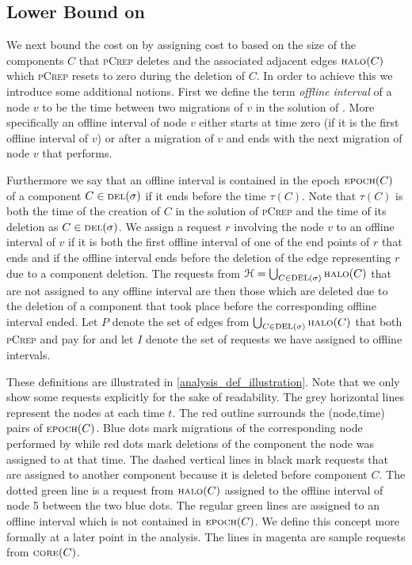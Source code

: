 \documentclass[a4paper,UKenglish,cleveref, autoref, thm-restate,authorcolumns]{lipics-v2019}
\newcommand{\adjDel}{\textsc{pCrep}}
\newcommand{\del}{\text{\scriptsize DEL}}
\newcommand{\opt}{\text{O{\scriptsize PT}}}
\newcommand{\core}{\text{\scriptsize CORE}}
\newcommand{\halo}{\text{\scriptsize HALO}}
\newcommand{\epoch}{\text{\scriptsize EPOCH}}
\begin{document}
\subsection{Lower Bound on \opt{}}

We next bound the cost on \opt{} by assigning cost to \opt{} based on the size of the components $C$ that \adjDel{} deletes and the associated adjacent edges $\halo(C)$ which \adjDel{} resets to zero during the deletion of $C$. In order to achieve this we introduce some additional notions.
First we define the term \textit{offline interval} of a node $v$ to be the time between two migrations of $v$ in the solution of \opt{}. More specifically an offline interval of node $v$ either starts at time zero (if it is the first offline interval of $v$) or after a migration of $v$ and ends with the next migration of node $v$ that \opt{} performs.

Furthermore we say that an offline interval is contained in the epoch $\epoch(C)$ of a component $C\in\del{}(\sigma)$ if it ends before the time $\tau(C)$. Note that $\tau(C)$ is both the time of the creation of $C$ in the solution of \adjDel{} and the time of its deletion as $C\in\del{}(\sigma)$.
We assign a request $r$ involving the node $v$ to an offline interval of $v$ if it is both the first offline interval of one of the end points of $r$ that ends and if the offline interval ends before the deletion of the edge representing $r$ due to a component deletion.
The requests from $\mathcal{H}=\bigcup_{C\in\del{}(\sigma)}\halo{}(C)$ that are not assigned to any offline interval are then those which are deleted due to the deletion of a component that took place before the corresponding offline interval ended.
Let $P$ denote the set of edges from $\bigcup_{C\in\del{}(\sigma)}\halo{}(C)$ that both \adjDel{} and \opt{} pay for and let $I$ denote the set of requests we have assigned to offline intervals.

These definitions are illustrated in \cref{analysis_def_illustration}. Note that we only show some requests explicitly for the sake of readability. The grey horizontal lines represent the nodes at each time $t$. The red outline surrounds the (node,time) pairs of $\epoch(C)$. Blue dots mark migrations of the corresponding node performed by \opt{} while red dots mark deletions of the component the node was assigned to at that time. The dashed vertical lines in black mark requests that are assigned to another component because it is deleted before component $C$. The dotted green line is a request from $\halo(C)$ assigned to the offline interval of node 5 between the two blue dots. The regular green lines are assigned to an offline interval which is not contained in $\epoch(C)$. We define this concept more formally at a later point in the analysis. The lines in magenta are sample requests from $\core(C)$.
\end{document}
